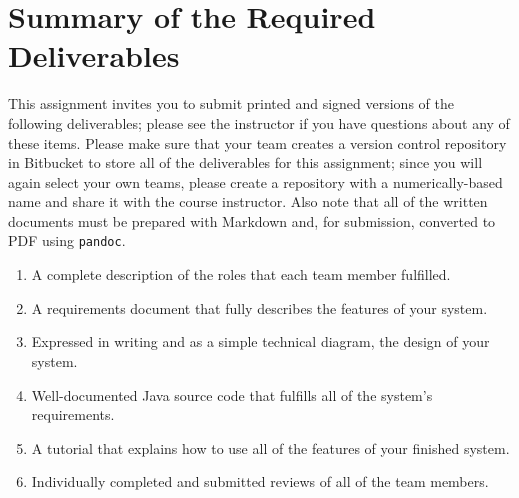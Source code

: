 \section*{Summary of the Required Deliverables}

This assignment invites you to submit printed and signed versions of the following deliverables; please see the
instructor if you have questions about any of these items. Please make sure that your team creates a version control
repository in Bitbucket to store all of the deliverables for this assignment; since you will again select your own
teams, please create a repository with a numerically-based name and share it with the course instructor. Also note that
all of the written documents must be prepared with Markdown and, for submission, converted to PDF using {\tt pandoc}.

\vspace*{-.1in}
\begin{enumerate}
  \setlength{\itemsep}{0in}
  \item A complete description of the roles that each team member fulfilled.
  \item A requirements document that fully describes the features of your system.
  \item Expressed in writing and as a simple technical diagram, the design of your system.
  \item Well-documented Java source code that fulfills all of the system's requirements.
  \item A tutorial that explains how to use all of the features of your finished system.
  \item Individually completed and submitted reviews of all of the team members.
\end{enumerate}
\vspace*{-.1in}


